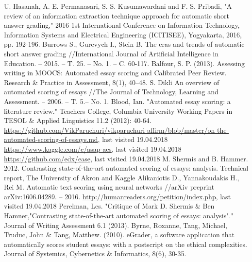 \documentclass[rnd]{mas_report}
\begin{document}
\begin{thebibliography}{3}
 U. Hasanah, A. E. Permanasari, S. S. Kusumawardani and F. S. Pribadi, "A review of an information extraction technique approach for automatic short answer grading," 2016 1st International Conference on Information Technology, Information Systems and Electrical Engineering (ICITISEE), Yogyakarta, 2016, pp. 192-196.
 Burrows S., Gurevych I., Stein B. The eras and trends of automatic short answer grading //International Journal of Artificial Intelligence in Education. -- 2015. -- T. 25. -- No. 1. -- C. 60-117.
 Balfour, S. P. (2013). Assessing writing in MOOCS: Automated essay scoring and Calibrated Peer Review. Research \& Practice in Assessment, 8(1), 40--48.
 S. Dikli  An overview of automated scoring of essays //The Journal of Technology, Learning and Assessment. -- 2006. -- T. 5.-- No. 1.
 Blood, Ian. "Automated essay scoring: a literature review." Teachers College, Columbia University Working Papers in TESOL \& Applied Linguistics 11.2 (2012): 40-64.
 \url{https://github.com/VikParuchuri/vikparuchuri-affirm/blob/master/on-the-automated-scoring-of-essays.md}, last visited 19.04.2018
 \url{https://www.kaggle.com/c/asap-aes}, last visited 19.04.2018
 \url{https://github.com/edx/ease}, last visited 19.04.2018
 M. Shermis and B. Hammer. 2012. Contrasting state-of-the-art automated scoring of essays: analysis. Technical report, The University of Akron and Kaggle
 Alikaniotis D., Yannakoudakis H., Rei M. Automatic text scoring using neural networks //arXiv preprint arXiv:1606.04289. – 2016.
 \url{http://humanreaders.org/petition/index.php}, last visited 19.04.2018
 Perelman, Les. "Critique of Mark D. Shermis \& Ben Hamner,"Contrasting state-of-the-art automated scoring of essays: analysis"." Journal of Writing Assessment 6.1 (2013).
 Byrne, Roxanne, Tang, Michael, Truduc, John \& Tang, Matthew. (2010). eGrader, a software application that automatically scores student essays: with a postscript on the ethical complexities. Journal of Systemics, Cybernetics \& Informatics, 8(6), 30-35.

\end{thebibliography}
\end{document}
